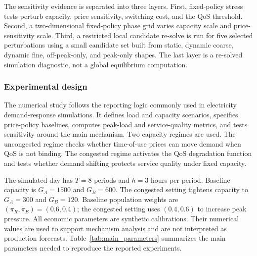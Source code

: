 \documentclass[11pt,a4paper]{article}
\begin{document}
The sensitivity evidence is separated into three layers. First, fixed-policy stress tests perturb capacity, price sensitivity, switching cost, and the QoS threshold. Second, a two-dimensional fixed-policy phase grid varies capacity scale and price-sensitivity scale. Third, a restricted local candidate re-solve is run for five selected perturbations using a small candidate set built from static, dynamic coarse, dynamic fine, off-peak-only, and peak-only shapes. The last layer is a re-solved simulation diagnostic, not a global equilibrium computation.

\subsubsection{Experimental design}
\label{sec:setup}

The numerical study follows the reporting logic commonly used in electricity demand-response simulations. It defines load and capacity scenarios, specifies price-policy baselines, computes peak-load and service-quality metrics, and tests sensitivity around the main mechanism. Two capacity regimes are used. The uncongested regime checks whether time-of-use prices can move demand when QoS is not binding. The congested regime activates the QoS degradation function and tests whether demand shifting protects service quality under fixed capacity.

The simulated day has $T=8$ periods and $h=3$ hours per period. Baseline capacity is $G_A=1500$ and $G_B=600$. The congested setting tightens capacity to $G_A=300$ and $G_B=120$. Baseline population weights are $(\pi_R,\pi_E)=(0.6,0.4)$; the congested setting uses $(0.4,0.6)$ to increase peak pressure. All economic parameters are synthetic calibrations. Their numerical values are used to support mechanism analysis and are not interpreted as production forecasts. Table~\ref{tab:main_parameters} summarizes the main parameters needed to reproduce the reported experiments.
\end{document}
